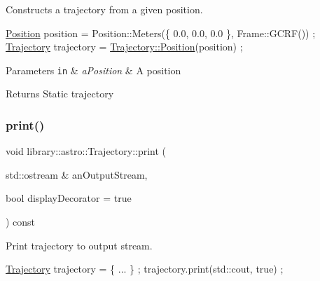 Constructs a trajectory from a given position. 


\begin{DoxyCode}
\hyperlink{classlibrary_1_1astro_1_1_trajectory_a39e9a50f84016cb53ca36d61809dc058}{Position} position = Position::Meters(\{ 0.0, 0.0, 0.0 \}, Frame::GCRF()) ;
\hyperlink{classlibrary_1_1astro_1_1_trajectory_a8e5c7740915ca947e067c0f419ac1c65}{Trajectory} trajectory = \hyperlink{classlibrary_1_1astro_1_1_trajectory_a39e9a50f84016cb53ca36d61809dc058}{Trajectory::Position}(position) ;
\end{DoxyCode}



\begin{DoxyParams}[1]{Parameters}
\mbox{\tt in}  & {\em a\+Position} & A position \\
\hline
\end{DoxyParams}
\begin{DoxyReturn}{Returns}
Static trajectory 
\end{DoxyReturn}
\mbox{\label{classlibrary_1_1astro_1_1_trajectory_a6f6afc6bcd8880d7debaa98a79bfa4e6}} 
\subsubsection{\texorpdfstring{print()}{print()}}
{\footnotesize\ttfamily void library\+::astro\+::\+Trajectory\+::print (\begin{DoxyParamCaption}\item[{std\+::ostream \&}]{an\+Output\+Stream,  }\item[{bool}]{display\+Decorator = {\ttfamily true} }\end{DoxyParamCaption}) const\hspace{0.3cm}{\ttfamily [virtual]}}



Print trajectory to output stream. 


\begin{DoxyCode}
\hyperlink{classlibrary_1_1astro_1_1_trajectory_a8e5c7740915ca947e067c0f419ac1c65}{Trajectory} trajectory = \{ ... \} ;
trajectory.print(std::cout, \textcolor{keyword}{true}) ;
\end{DoxyCode}



